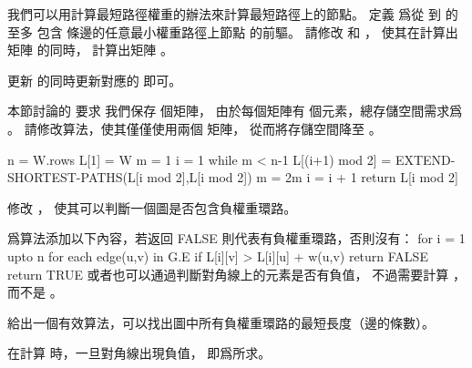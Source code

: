 \startEXERCISE
我們可以用計算最短路徑權重的辦法來計算最短路徑上的節點。
定義  爲從  到  的至多
包含  條邊的任意最小權重路徑上節點  的前驅。
請修改  和 ，
使其在計算出矩陣  的同時，
計算出矩陣 。
\stopEXERCISE

\startANSWER
更新  的同時更新對應的 \m{\prod} 即可。
\stopANSWER

\startEXERCISE
本節討論的  要求
我們保存  個矩陣，
由於每個矩陣有  個元素，總存儲空間需求爲 。
請修改算法，使其僅僅使用兩個  矩陣，
從而將存儲空間降至 。
\stopEXERCISE

\startANSWER
{}
\startCLRS
n = W.rows
L[1] = W
m = 1
i = 1
while m < n-1
	L[(i+1) mod 2] = EXTEND-SHORTEST-PATHS(L[i mod 2],L[i mod 2])
	m = 2m
	i = i + 1
return L[i mod 2]
\stopCLRS
\stopANSWER

\startEXERCISE
修改 ，
使其可以判斷一個圖是否包含負權重環路。
\stopEXERCISE

\startANSWER
爲算法添加以下內容，若返回 FALSE 則代表有負權重環路，否則沒有：
\startCLRS
for i = 1 upto n
	for each edge(u,v) in G.E
		if L[i][v] > L[i][u] + w(u,v)
			return FALSE
return TRUE
\stopCLRS
或者也可以通過判斷對角線上的元素是否有負值，
不過需要計算 ，而不是 。
\stopANSWER

\startEXERCISE
給出一個有效算法，可以找出圖中所有負權重環路的最短長度（邊的條數）。
\stopEXERCISE

\startANSWER
在計算  時，一旦對角線出現負值，  即爲所求。
\stopANSWER

\stopsection
